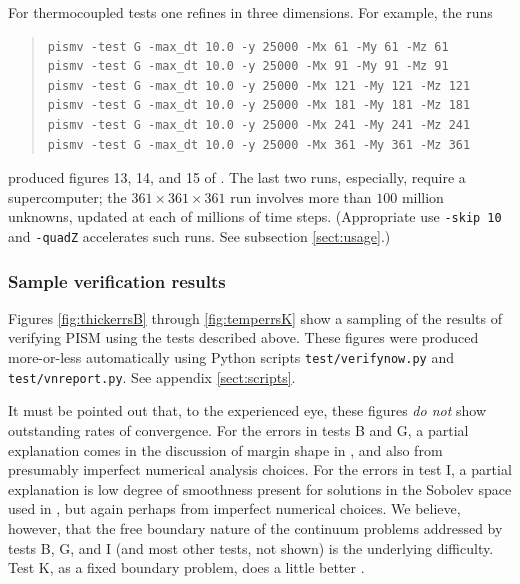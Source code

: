 \documentclass[11pt,final]{amsart}
\begin{document}
For thermocoupled tests one refines in three dimensions.  For example, the runs
\begin{quote}\small
\begin{verbatim}
pismv -test G -max_dt 10.0 -y 25000 -Mx 61 -My 61 -Mz 61
pismv -test G -max_dt 10.0 -y 25000 -Mx 91 -My 91 -Mz 91
pismv -test G -max_dt 10.0 -y 25000 -Mx 121 -My 121 -Mz 121
pismv -test G -max_dt 10.0 -y 25000 -Mx 181 -My 181 -Mz 181
pismv -test G -max_dt 10.0 -y 25000 -Mx 241 -My 241 -Mz 241
pismv -test G -max_dt 10.0 -y 25000 -Mx 361 -My 361 -Mz 361
\end{verbatim}
\normalsize\end{quote}
produced figures 13, 14, and 15 of \cite{BBL}.  The last two runs, especially, require a supercomputer; the $361\times 361\times 361$ run involves more than $100$ million unknowns, updated at each of millions of time steps.  (Appropriate use \verb|-skip 10| and \verb|-quadZ| accelerates such runs.  See subsection \ref{sect:usage}.)

\subsubsection*{Sample verification results}  Figures \ref{fig:thickerrsB} through \ref{fig:temperrsK} show a sampling of the results of verifying PISM using the tests described above.  These figures were produced more-or-less automatically using Python scripts \verb|test/verifynow.py| and \verb|test/vnreport.py|.  See appendix \ref{sect:scripts}.

It must be pointed out that, to the experienced eye, these figures \emph{do not} show outstanding rates of convergence.  For the errors in tests B and G, a partial explanation comes in the discussion of margin shape in \cite{BLKCB}, and also from presumably imperfect numerical analysis choices.  For the errors in test I, a partial explanation is low degree of smoothness present for solutions in the Sobolev space used in \cite{SchoofStream}, but again perhaps from imperfect numerical choices.  We believe, however, that the free boundary nature of the continuum problems addressed by tests B, G, and I (and most other tests, not shown) is the underlying difficulty.  Test K, as a fixed boundary problem, does a little better \cite{BuelerTestK}.
\end{document}
